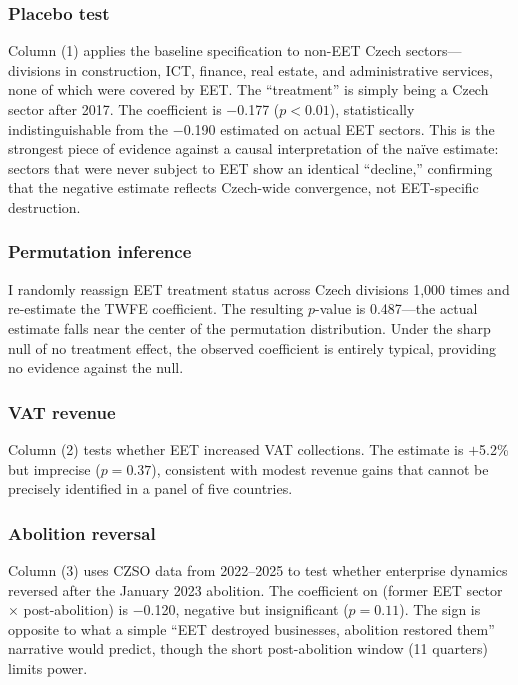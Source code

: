 \documentclass[12pt]{article}
\begin{document}
\subsubsection*{Placebo test} Column (1) applies the baseline specification to non-EET Czech sectors---divisions in construction, ICT, finance, real estate, and administrative services, none of which were covered by EET. The ``treatment'' is simply being a Czech sector after 2017. The coefficient is $-$0.177 ($p < 0.01$), statistically indistinguishable from the $-$0.190 estimated on actual EET sectors. This is the strongest piece of evidence against a causal interpretation of the na\"{i}ve estimate: sectors that were never subject to EET show an identical ``decline,'' confirming that the negative estimate reflects Czech-wide convergence, not EET-specific destruction.

\subsubsection*{Permutation inference} I randomly reassign EET treatment status across Czech divisions 1,000 times and re-estimate the TWFE coefficient. The resulting $p$-value is 0.487---the actual estimate falls near the center of the permutation distribution. Under the sharp null of no treatment effect, the observed coefficient is entirely typical, providing no evidence against the null.

\subsubsection*{VAT revenue} Column (2) tests whether EET increased VAT collections. The estimate is $+$5.2\% but imprecise ($p = 0.37$), consistent with modest revenue gains that cannot be precisely identified in a panel of five countries.

\subsubsection*{Abolition reversal} Column (3) uses CZSO data from 2022--2025 to test whether enterprise dynamics reversed after the January 2023 abolition. The coefficient on (former EET sector $\times$ post-abolition) is $-$0.120, negative but insignificant ($p = 0.11$). The sign is opposite to what a simple ``EET destroyed businesses, abolition restored them'' narrative would predict, though the short post-abolition window (11 quarters) limits power.
\end{document}

